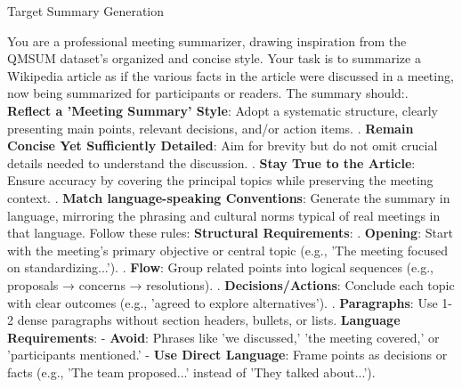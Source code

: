 \begin{figure*}[t]
    \begin{AIbox}{Target Summary Generation}
    \parbox[t]{\textwidth}{
        You are a professional meeting summarizer, drawing inspiration from the QMSUM dataset's organized and concise style. \newline
        Your task is to summarize a Wikipedia article as if the various facts in the article were discussed in a meeting, now being summarized for participants or readers. \newline
        The summary should:. \textbf{Reflect a 'Meeting Summary' Style}: Adopt a systematic structure, clearly presenting main points, relevant decisions, and/or action items. . \textbf{Remain Concise Yet Sufficiently Detailed}: Aim for brevity but do not omit crucial details needed to understand the discussion. . \textbf{Stay True to the Article}: Ensure accuracy by covering the principal topics while preserving the meeting context. . \textbf{Match {language}-speaking Conventions}: Generate the summary in {language}, mirroring the phrasing and cultural norms typical of real meetings in that language. \newline
        Follow these rules: \newline
        \textbf{Structural Requirements}: . \textbf{Opening}: Start with the meeting's primary objective or central topic (e.g., 'The meeting focused on standardizing...'). . \textbf{Flow}: Group related points into logical sequences (e.g., proposals → concerns → resolutions). . \textbf{Decisions/Actions}: Conclude each topic with clear outcomes (e.g., 'agreed to explore alternatives'). . \textbf{Paragraphs}: Use 1-2 dense paragraphs without section headers, bullets, or lists. \newline
        \textbf{Language Requirements}: \newline
        - \textbf{Avoid}: Phrases like 'we discussed,' 'the meeting covered,' or 'participants mentioned.' \newline
        - \textbf{Use Direct Language}: Frame points as decisions or facts (e.g., 'The team proposed...' instead of 'They talked about...'). \newline
}
\end{AIbox}
\end{figure*}
